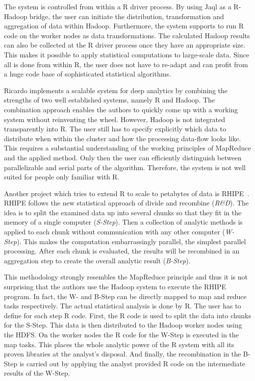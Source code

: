 The system is controlled from within a R driver process.
By using Jaql as a R-Hadoop bridge, the user can initiate the distribution, transformation and aggregation of data within Hadoop.
Furthermore, the system supports to run R code on the worker nodes as data transformations.
The calculated Hadoop results can also be collected at the R driver process once they have an appropriate size.
This makes it possible to apply statistical computations to large-scale data.
Since all is done from within R, the user does not have to re-adapt and can profit from a huge code base of sophisticated statistical algorithms.

Ricardo implements a scalable system for deep analytics by combining the strengths of two well established systems, namely R and Hadoop.
The combination approach enables the authors to quickly come up with a working system without reinventing the wheel.
However, Hadoop is not integrated transparently into R.
The user still has to specify explicitly which data to distribute when within the cluster and how the processing data-flow looks like.
This requires a substantial understanding of the working principles of MapReduce and the applied method.
Only then the user can efficiently distinguish between parallelizable and serial parts of the algorithm.
Therefore, the system is not well suited for people only familiar with R.

Another project which tries to extend R to scale to petabytes of data is RHIPE~\cite{guha:s2012a}.
RHIPE follows the new statistical approach of divide and recombine (\emph{R\&D}).
The idea is to split the examined data up into several chunks so that they fit in the memory of a single computer (\emph{S-Step}).
Then a collection of analytic methods is applied to each chunk without communication with any other computer (\emph{W-Step}).
This makes the computation embarrassingly parallel, the simplest parallel processing.
After each chunk is evaluated, the results will be recombined in an aggregation step to create the overall analytic result (\emph{B-Step}).

This methodology strongly resembles the MapReduce principle and thus it is not surprising that the authors use the Hadoop system to execute the RHIPE program.
In fact, the W- and B-Step can be directly mapped to map and reduce tasks respectively.
The actual statistical analysis is done by R.
The user has to define for each step R code.
First, the R code is used to split the data into chunks for the S-Step.
This data is then distributed to the Hadoop worker nodes using the HDFS.
On the worker nodes the R code for the W-Step is executed in the map tasks.
This places the whole analytic power of the R system with all its proven libraries at the analyst's disposal.
And finally, the recombination in the B-Step is carried out by applying the analyst provided R code on the intermediate results of the W-Step.

